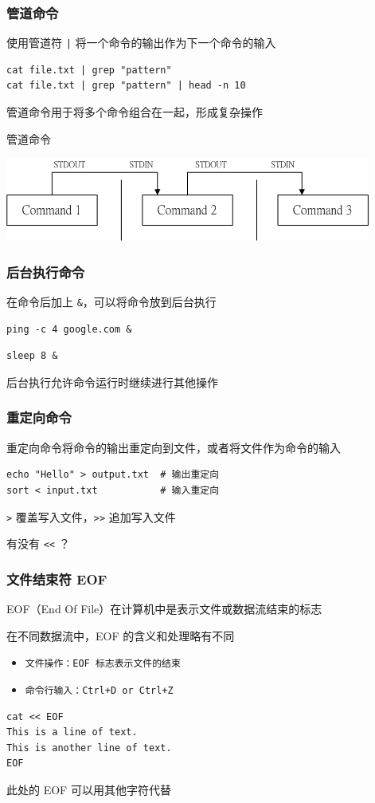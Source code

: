 \documentclass[UTF8, 16pt]{beamer}
\begin{document}
\begin{frame}[fragile]
    \frametitle{管道命令}
    
    使用管道符 \texttt{|} 将一个命令的输出作为下一个命令的输入
    \begin{lstlisting}
cat file.txt | grep "pattern"
cat file.txt | grep "pattern" | head -n 10\end{lstlisting}
    管道命令用于将多个命令组合在一起，形成复杂操作
\end{frame}

\begin{frame}
    \centering
    \textcolor{sufered}{管道命令}
    
    \includegraphics[width=0.95\linewidth]{shell/pipe.png}
\end{frame}

\begin{frame}[fragile]
    \frametitle{后台执行命令}
    
    在命令后加上 \texttt{\&}，可以将命令放到后台执行
    \begin{lstlisting}[numbers=none]
ping -c 4 google.com &\end{lstlisting}
    \begin{lstlisting}[numbers=none]
sleep 8 &\end{lstlisting}
    后台执行允许命令运行时继续进行其他操作
\end{frame}

\begin{frame}[fragile]
    \frametitle{重定向命令}
    
    重定向命令将命令的输出重定向到文件，或者将文件作为命令的输入
    \begin{lstlisting}
echo "Hello" > output.txt  # 输出重定向
sort < input.txt           # 输入重定向\end{lstlisting}
    \texttt{>} 覆盖写入文件，\texttt{>>} 追加写入文件
    
    有没有 \texttt{<<} ？
\end{frame}

\begin{frame}[fragile]
    \frametitle{文件结束符 EOF}
    
    EOF（End Of File）在计算机中是表示文件或数据流结束的标志
    
    在不同数据流中，EOF 的含义和处理略有不同
    \begin{itemize}
        \item \texttt{文件操作：EOF 标志表示文件的结束}
        \item \texttt{命令行输入：Ctrl+D or Ctrl+Z}
    \end{itemize}
    \begin{lstlisting}
cat << EOF
This is a line of text.
This is another line of text.
EOF\end{lstlisting}
    此处的 EOF 可以用其他字符代替
\end{frame}
\end{document}
